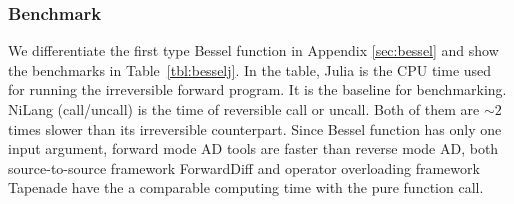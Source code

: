 \documentclass{article}
\newcommand{\<}{\langle}
\renewcommand{\>}{\rangle}
\newcommand{\Tbl}[1]{Table~\ref{#1}}
\newcommand{\App}[1]{Appendix \ref{#1}}
\newcommand{\ra}[1]{\renewcommand{\arraystretch}{#1}}
\theoremstyle{definition}\newtheorem{definition}{\textit{Definition}}
\begin{document}
\subsubsection{Benchmark}\label{sec:besselbench}
We differentiate the first type Bessel function in \App{sec:bessel} and show the benchmarks in \Tbl{tbl:besselj}.
In the table, Julia is the CPU time used for running the irreversible forward program. It is the baseline for benchmarking.
NiLang (call/uncall) is the time of reversible call or uncall. Both of them are $\sim2$ times slower than its irreversible counterpart. Since Bessel function has only one input argument, forward mode AD tools are faster than reverse mode AD, both source-to-source framework ForwardDiff and operator overloading framework Tapenade have the a comparable computing time with the pure function call.
\begin{table}[h!]\centering
\begin{minipage}{0.8\columnwidth}
\ra{1.3}
    \caption{Time and space used for computing objective (O) and gradient (G) of the first kind Bessel function $J_2(1.0)$.
    The CUDA benchmark time is averaged over a batch size of 4000, which is not a fair comparison but shows how much performance can we get from GPU in the parallel computing context.
}\label{tbl:besselj}
\end{minipage}
\end{table}
\end{document}
